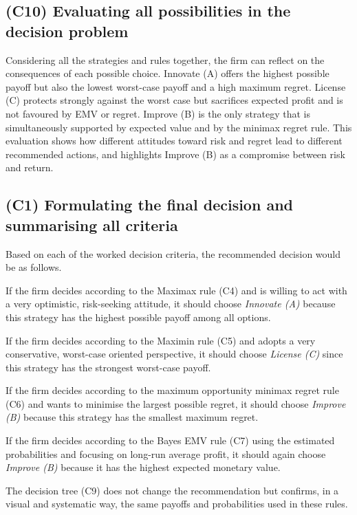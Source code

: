 	\subsection{(C10) Evaluating all possibilities in the decision problem}\label{example-1-c10}
	
	Considering all the strategies and rules together, the firm can reflect on the consequences of each possible choice.
	Innovate (A) offers the highest possible payoff but also the lowest worst-case payoff and a high maximum regret.
	License (C) protects strongly against the worst case but sacrifices expected profit and is not favoured by EMV or regret.
	Improve (B) is the only strategy that is simultaneously supported by expected value and by the minimax regret rule.
	This evaluation shows how different attitudes toward risk and regret lead to different recommended actions,
	and highlights Improve (B) as a compromise between risk and return.
	
	\subsection{(C1) Formulating the final decision and summarising all criteria}\label{example-1-c1}
	
	Based on each of the worked decision criteria, the recommended decision would be as follows.
	
	If the firm decides according to the Maximax rule (C4) and is willing to act with a very optimistic, risk-seeking attitude,
	it should choose \emph{Innovate (A)} because this strategy has the highest possible payoff among all options.
	
	If the firm decides according to the Maximin rule (C5) and adopts a very conservative, worst-case oriented perspective,
	it should choose \emph{License (C)} since this strategy has the strongest worst-case payoff.
	
	If the firm decides according to the maximum opportunity minimax regret rule (C6) and wants to minimise the largest possible regret,
	it should choose \emph{Improve (B)} because this strategy has the smallest maximum regret.
	
	If the firm decides according to the Bayes EMV rule (C7) using the estimated probabilities and focusing on long-run average profit,
	it should again choose \emph{Improve (B)} because it has the highest expected monetary value.
	
	The decision tree (C9) does not change the recommendation but confirms, in a visual and systematic way,
	the same payoffs and probabilities used in these rules.
	
